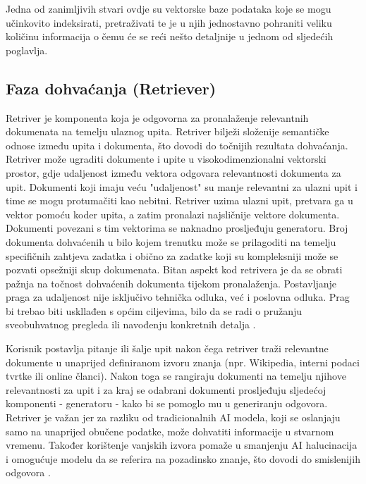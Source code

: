 \documentclass[]{foi}
\begin{document}
 Jedna od zanimljivih stvari ovdje su vektorske baze podataka koje se mogu učinkovito indeksirati, pretraživati te je u njih jednostavno pohraniti veliku količinu informacija o čemu
 će se reći nešto detaljnije u jednom od sljedećih poglavlja.
 

\subsection{Faza dohvaćanja (Retriever)}

Retriver je komponenta koja je odgovorna za pronalaženje relevantnih dokumenata na temelju ulaznog upita. Retriver bilježi složenije semantičke odnose između upita i dokumenta, što dovodi do točnijih
rezultata dohvaćanja. Retriver može ugraditi dokumente i upite u visokodimenzionalni vektorski prostor, gdje udaljenost između vektora odgovara relevantnosti dokumenta za upit.
Dokumenti koji imaju veću "udaljenost" su manje relevantni za ulazni upit i time se mogu protumačiti kao nebitni. Retriver uzima ulazni upit, pretvara ga u vektor pomoću koder upita, a zatim
pronalazi najsličnije vektore dokumenta. Dokumenti povezani s tim vektorima se naknadno prosljeđuju generatoru. Broj dokumenta dohvaćenih u bilo kojem trenutku može se prilagoditi na temelju
specifičnih zahtjeva zadatka i obično za zadatke koji su kompleksniji može se pozvati opsežniji skup dokumenata.  Bitan aspekt kod retrivera je da se obrati pažnja na točnost dohvaćenih dokumenta
tijekom pronalaženja. Postavljanje praga za udaljenost nije isključivo tehnička odluka, već i poslovna odluka. Prag bi trebao biti uskllađen s općim ciljevima, bilo da se radi o pružanju
sveobuhvatnog pregleda ili navođenju konkretnih detalja \cite{redis2025}. 

Korisnik postavlja pitanje ili šalje upit nakon čega retriver traži relevantne dokumente u unaprijed definiranom izvoru znanja (npr. Wikipedia, interni podaci tvrtke ili online članci).
Nakon toga se rangiraju dokumenti na temelju njihove relevantnosti za upit i za kraj se odabrani dokumenti prosljeđuju sljedećoj komponenti - generatoru - kako bi se pomoglo mu u generiranju odgovora.
Retriver je važan jer za razliku od tradicionalnih AI modela, koji se oslanjaju samo na unaprijed obučene podatke, može dohvatiti informacije u stvarnom vremenu. Također korištenje 
vanjskih izvora pomaže u smanjenju AI halucinacija i omogućuje modelu da se referira na pozadinsko znanje, što dovodi do smislenijih odgovora \cite{shaheryar2025}.
\end{document}
